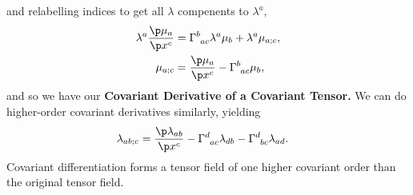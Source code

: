 \documentclass[a4paper, 11pt, normalem]{report}
\begin{document}
and relabelling indices to get all $\lambda$ compenents to $\lambda^a$,
\begin{align}
    \lambda^a\frac{\p\mu_a}{\p x^c} &= \tensor{\Gamma}{^b_{ac}}\lambda^a\mu_b +\lambda^a\mu_{a;c},\\
    \mu_{a;c} &= \frac{\p\mu_a}{\p x^c}-\tensor{\Gamma}{^b_{ac}}\mu_b,
\end{align}
and so we have our \textbf{Covariant Derivative of a Covariant Tensor.}
We can do higher-order covariant derivatives similarly, yielding
\begin{align}
    \lambda_{ab;c} &= \frac{\p\lambda_{ab}}{\p x^c} - \tensor{\Gamma}{^d_{ac}}\lambda_{db}-\tensor{\Gamma}{^d_{bc}}\lambda_{ad}.
\end{align}
Covariant differentiation forms a tensor field of one higher covariant order than the original tensor field.
\end{document}
